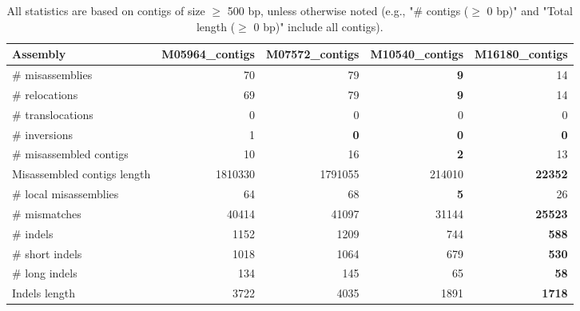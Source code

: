 \documentclass[12pt,a4paper]{article}
\begin{document}
\begin{table}[ht]
\begin{center}
\caption{All statistics are based on contigs of size $\geq$ 500 bp, unless otherwise noted (e.g., "\# contigs ($\geq$ 0 bp)" and "Total length ($\geq$ 0 bp)" include all contigs).}
\begin{tabular}{|l*{4}{|r}|}
\hline
Assembly & M05964\_contigs & M07572\_contigs & M10540\_contigs & M16180\_contigs \\ \hline
\# misassemblies & 70 & 79 & {\bf 9} & 14 \\ \hline
\hspace{5mm}\# relocations & 69 & 79 & {\bf 9} & 14 \\ \hline
\hspace{5mm}\# translocations & 0 & 0 & 0 & 0 \\ \hline
\hspace{5mm}\# inversions & 1 & {\bf 0} & {\bf 0} & {\bf 0} \\ \hline
\# misassembled contigs & 10 & 16 & {\bf 2} & 13 \\ \hline
Misassembled contigs length & 1810330 & 1791055 & 214010 & {\bf 22352} \\ \hline
\# local misassemblies & 64 & 68 & {\bf 5} & 26 \\ \hline
\# mismatches & 40414 & 41097 & 31144 & {\bf 25523} \\ \hline
\# indels & 1152 & 1209 & 744 & {\bf 588} \\ \hline
\hspace{5mm}\# short indels & 1018 & 1064 & 679 & {\bf 530} \\ \hline
\hspace{5mm}\# long indels & 134 & 145 & 65 & {\bf 58} \\ \hline
Indels length & 3722 & 4035 & 1891 & {\bf 1718} \\ \hline
\end{tabular}
\end{center}
\end{table}
\end{document}
